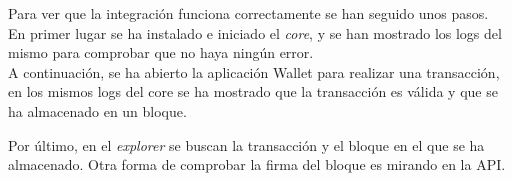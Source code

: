 Para ver que la integración funciona correctamente se han seguido unos pasos.\\ 

En primer lugar se ha instalado e iniciado el \textit{core}, y se han mostrado los logs del mismo para comprobar que no haya ningún error.\\

A continuación, se ha abierto la aplicación Wallet para realizar una transacción, en los mismos logs del core se ha mostrado que la transacción es válida y que se ha almacenado en un bloque.

Por último, en el \textit{explorer} se buscan la transacción y el bloque en el que se ha almacenado. Otra forma de comprobar la firma del bloque es mirando en la API.
